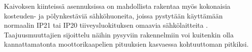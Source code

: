 \documentclass[finnish,12pt,a4paper,pdftex,elec,utf8]{aaltothesis}
\begin{document}
\noindent
Kaivoksen kiinteissä asennuksissa on mahdollista rakentaa myös kokonaisia kosteuden- ja pölynkestäviä sähköhuoneita, joissa pystytään käyttämään normaalin IP21 tai IP20 tiiveysluokituksen omaavia sähkölaitteita \cite[s.253]{Hakapää}. Taajuusmuuttajien sijoittelu näihin pysyviin rakennelmiin voi kuitenkin olla kannattamatonta moottorikaapelien pituuksien kasvaessa kohtuuttoman pitkiksi.








\end{document}
